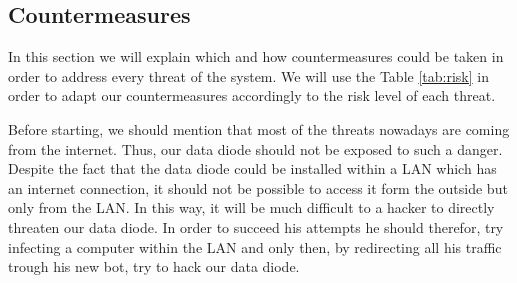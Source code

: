 \documentclass[a4paper,10pt]{article}
\begin{document}
\subsection{Countermeasures}
In this section we will explain which and how countermeasures could be taken in order to address every threat of the system. We will use the Table \ref{tab:risk} in order to adapt our countermeasures accordingly to the risk level of each threat.

Before starting, we should mention that most of the threats nowadays are coming from the internet. Thus, our data diode should not be exposed to such a danger. Despite the fact that the data diode could be installed within a LAN which has an internet connection, it should not be possible to access it form the outside but only from the LAN. In this way, it will be much difficult to a hacker to directly threaten our data diode. In order to succeed his attempts he should therefor, try infecting a computer within the LAN and only then, by redirecting all his traffic trough his new bot, try to hack our data diode.
\end{document}
